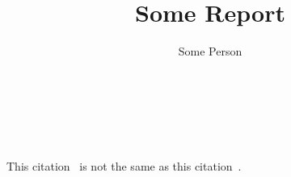 \documentclass[a4paper]{article}
\title{Some Report}
\author{Some Person}
\begin{document}
\maketitle

\lipsum[1]~\cite{GMP81,DBLP:journals/entcs/CardelliGG07,Tot97}

\lipsum[2]~\cite{DBLP:conf/aplas/CalcagnoDG07,DBLP:journals/tcs/Gardner99}

This citation~\cite{DBLP:conf/csl/BarberGHP97} is not the same as this citation~\cite{GMP81}.



\end{document}
